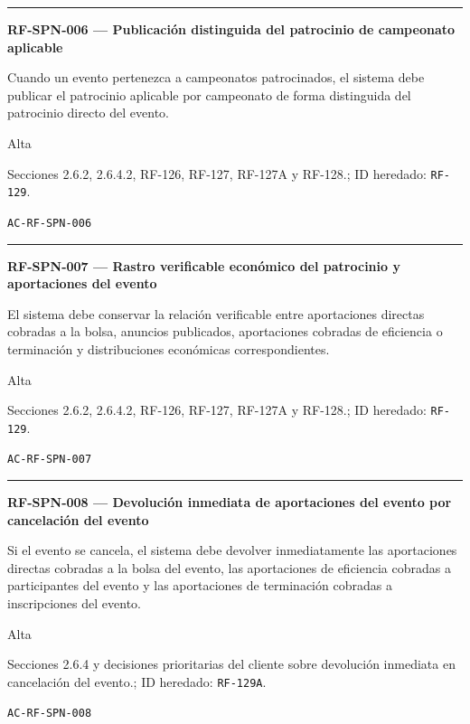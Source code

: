 \documentclass[10pt,letterpaper]{article}
\begin{document}
\vspace{0.25em}\hrule\vspace{0.65em}
\noindent\textbf{RF-SPN-006 --- Publicación distinguida del patrocinio de campeonato aplicable}\par
\begin{description}[style=nextline,leftmargin=3.15cm,labelwidth=2.8cm,font=\normalfont\bfseries]
\item[Obligación] Cuando un evento pertenezca a campeonatos patrocinados, el sistema debe publicar el patrocinio aplicable por campeonato de forma distinguida del patrocinio directo del evento.
\item[Prioridad] Alta
\item[Procedencia] Secciones 2.6.2, 2.6.4.2, RF-126, RF-127, RF-127A y RF-128.; ID heredado: \texttt{RF-129}.
\item[Verificación] \texttt{AC-RF-SPN-006}
\end{description}
\vspace{0.25em}\hrule\vspace{0.65em}
\noindent\textbf{RF-SPN-007 --- Rastro verificable económico del patrocinio y aportaciones del evento}\par
\begin{description}[style=nextline,leftmargin=3.15cm,labelwidth=2.8cm,font=\normalfont\bfseries]
\item[Obligación] El sistema debe conservar la relación verificable entre aportaciones directas cobradas a la bolsa, anuncios publicados, aportaciones cobradas de eficiencia o terminación y distribuciones económicas correspondientes.
\item[Prioridad] Alta
\item[Procedencia] Secciones 2.6.2, 2.6.4.2, RF-126, RF-127, RF-127A y RF-128.; ID heredado: \texttt{RF-129}.
\item[Verificación] \texttt{AC-RF-SPN-007}
\end{description}
\vspace{0.25em}\hrule\vspace{0.65em}
\noindent\textbf{RF-SPN-008 --- Devolución inmediata de aportaciones del evento por cancelación del evento}\par
\begin{description}[style=nextline,leftmargin=3.15cm,labelwidth=2.8cm,font=\normalfont\bfseries]
\item[Obligación] Si el evento se cancela, el sistema debe devolver inmediatamente las aportaciones directas cobradas a la bolsa del evento, las aportaciones de eficiencia cobradas a participantes del evento y las aportaciones de terminación cobradas a inscripciones del evento.
\item[Prioridad] Alta
\item[Procedencia] Secciones 2.6.4 y decisiones prioritarias del cliente sobre devolución inmediata en cancelación del evento.; ID heredado: \texttt{RF-129A}.
\item[Verificación] \texttt{AC-RF-SPN-008}
\end{description}
\end{document}

